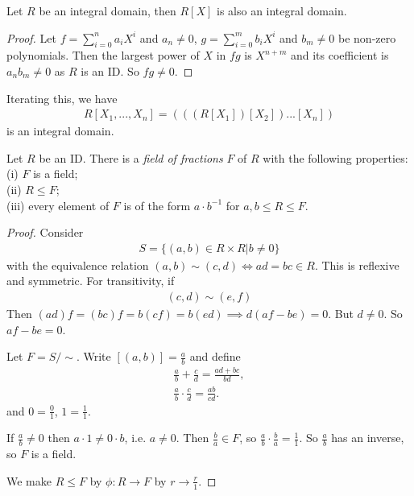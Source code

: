 \documentclass[a4paper]{article}
\begin{document}
\begin{lemma}
Let $R$ be an integral domain, then $R[X]$ is also an integral domain.
\begin{proof}
Let $f=\sum_{i=0}^n a_i X^i$ and $a_n \neq 0$, $g=\sum_{i=0}^m b_i X^i$ and $b_m \neq 0$ be non-zero polynomials. Then the largest power of $X$ in $fg$ is $X^{n+m}$ and its coefficient is $a_nb_m \neq 0$ as $R$ is an ID. So $fg \neq 0$.
\end{proof}
\end{lemma}

Iterating this, we have
\begin{equation*}
\begin{aligned}
R[X_1,...,X_n] = (((R[X_1])[X_2])...[X_n])
\end{aligned}
\end{equation*}
is an integral domain.

\begin{thm}
Let $R$ be an ID. There is a \emph{field of fractions} $F$ of $R$ with the following properties:\\
(i) $F$ is a field;\\
(ii) $R \leq F$;\\
(iii) every element of $F$ is of the form $a \cdot b^{-1}$ for $a,b \leq R \leq F$.
\end{thm}
\begin{proof}
Consider
\begin{equation*}
\begin{aligned}
S=\{(a,b)\in R\times R| b\neq 0\}
\end{aligned}
\end{equation*}
with the equivalence relation $(a,b) \sim (c,d) \iff ad=bc \in R$. This is reflexive and symmetric. For transitivity, if 
\begin{equation*}
\begin{aligned}
(c,d) \sim (e,f)
\end{aligned}
\end{equation*}
Then $(ad)f = (bc)f = b(cf) = b(ed) \implies d(af-be) =0 $. But $d \neq 0$. So $af-be = 0$.

Let $F = S/\sim$. Write $[(a,b)] = \frac{a}{b}$ and define
\begin{equation*}
\begin{aligned}
\frac{a}{b} + \frac{c}{d} = \frac{ad+bc}{bd},\\
\frac{a}{b} \cdot \frac{c}{d} = \frac{ab}{cd}.
\end{aligned}
\end{equation*}
and $0=\frac{0}{1}$, $1=\frac{1}{1}$.

If $\frac{a}{b} \neq 0$ then $a \cdot 1 \neq 0 \cdot b$, i.e. $a \neq 0$. Then $\frac{b}{a} \in F$, so $\frac{a}{b} \cdot \frac{b}{a} = \frac{1}{1}$. So $\frac{a}{b}$ has an inverse, so $F$ is a field.

We make $R \leq F$ by $\phi:R \to F$ by $r \to \frac{r}{1}$.
\end{proof}
\end{document}

